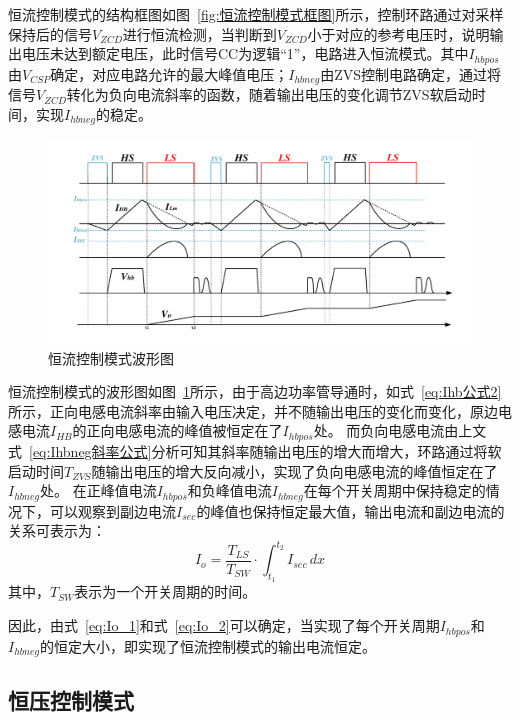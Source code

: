 恒流控制模式的结构框图如图~\ref{fig:恒流控制模式框图}所示，控制环路通过对采样保持后的信号$V_{ZCD}$进行恒流检测，当判断到$V_{ZCD}$小于对应的参考电压时，说明输出电压未达到额定电压，此时信号CC为逻辑“1”，电路进入恒流模式。其中$I_{hbpos}$由$V_{CSP}$确定，对应电路允许的最大峰值电压；$I_{hbneg}$由ZVS控制电路确定，通过将信号$V_{ZCD}$转化为负向电流斜率的函数，随着输出电压的变化调节ZVS软启动时间，实现$I_{hbneg}$的稳定。

\begin{figure}[htbp] 
    \centering
    \includegraphics[width=1.0\linewidth]{figures/恒流环路波形图.pdf}
    \caption{恒流控制模式波形图}
    \label{fig:恒流控制模式波形图}
\end{figure}

恒流控制模式的波形图如图~\ref{fig:恒流控制模式波形图}所示，由于高边功率管导通时，如式~\ref{eq:Ihb公式2}所示，正向电感电流斜率由输入电压决定，并不随输出电压的变化而变化，原边电感电流$I_{HB}$的正向电感电流的峰值被恒定在了$I_{hbpos}$处。
而负向电感电流由上文式~\ref{eq:Ihbneg斜率公式}分析可知其斜率随输出电压的增大而增大，环路通过将软启动时间$T_{ZVS}$随输出电压的增大反向减小，实现了负向电感电流的峰值恒定在了$I_{hbneg}$处。
在正峰值电流$I_{hbpos}$和负峰值电流$I_{hbneg}$在每个开关周期中保持稳定的情况下，可以观察到副边电流$I_{sec}$的峰值也保持恒定最大值，输出电流和副边电流的关系可表示为：
\begin{equation}
    \label{eq:Io_2}
    I_o=\frac{T_{LS}}{T_{SW}} \cdot \int_{t_1}^{t_2} I_{sec} \,dx 
\end{equation}
其中，$T_{SW}$表示为一个开关周期的时间。

因此，由式~\ref{eq:Io_1}和式~\ref{eq:Io_2}可以确定，当实现了每个开关周期$I_{hbpos}$和$I_{hbneg}$的恒定大小，即实现了恒流控制模式的输出电流恒定。


\subsection{恒压控制模式}

